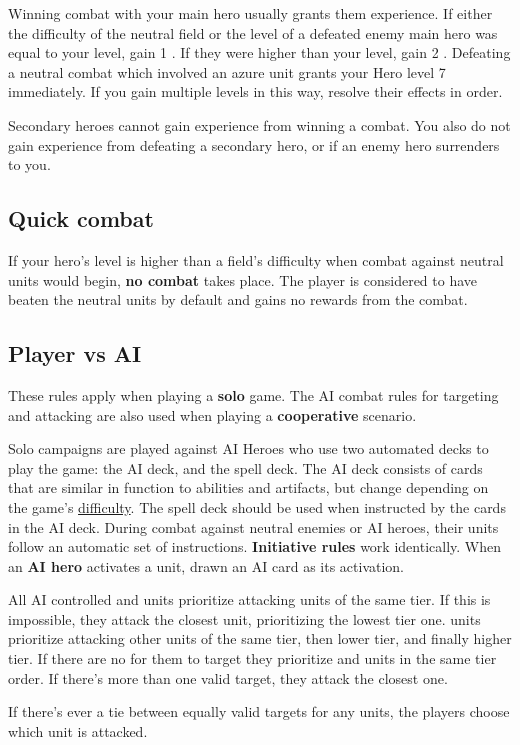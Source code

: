 Winning combat with your main hero usually grants them experience.
If either the difficulty of the neutral field or the level of a defeated enemy main hero was equal to your level, gain 1 .
If they were higher than your level, gain 2 .
Defeating a neutral combat which involved an azure  unit grants your Hero level 7 immediately.
If you gain multiple levels in this way, resolve their effects in order.\par
Secondary heroes cannot gain experience from winning a combat.
You also do not gain experience from defeating a secondary hero, or if an enemy hero surrenders to you.
\subsection*{\hypertarget{Quick}{Quick combat}}
If your hero’s level is higher than a field’s difficulty when combat against neutral units would begin, \textbf{no combat} takes place.
The player is considered to have beaten the neutral units by default and gains no rewards from the combat.

\subsection*{\hypertarget{AIrules}{Player vs AI}}
These rules apply when playing a \textbf{solo} game.
The AI combat rules for targeting and attacking are also used when playing a \textbf{cooperative} scenario.\par
Solo campaigns are played against AI Heroes who use two automated decks to play the game: the AI deck, and the spell deck.
The AI deck consists of cards that are similar in function to abilities and artifacts, but change depending on the game's \hyperlink{Difficulty}{difficulty}.
The spell deck should be used when instructed by the cards in the AI deck.
During combat against neutral enemies or AI heroes, their units follow an automatic set of instructions.
\textbf{Initiative rules} work identically.
When an \textbf{AI hero} activates a unit, drawn an AI card as its activation.\par
All AI controlled  and  units prioritize attacking units of the same tier.
If this is impossible, they attack the closest unit, prioritizing the lowest tier one.
 units prioritize attacking other  units of the same tier, then lower tier, and finally higher tier.
If there are no  for them to target they prioritize  and  units in the same tier order.
If there's more than one valid target, they attack the closest one.\par
If there's ever a tie between equally valid targets for any units, the players choose which unit is attacked.

